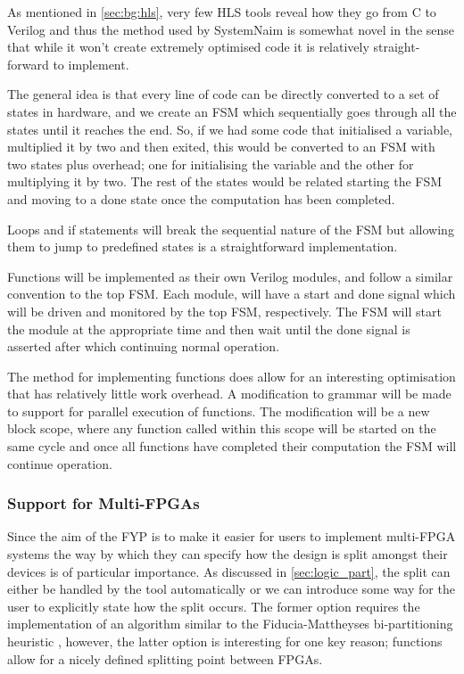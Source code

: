 As mentioned in \autoref{sec:bg:hls}, very few HLS tools reveal how they go from C to Verilog and thus the method used by SystemNaim is somewhat novel in the sense that while it won't create extremely optimised code it is relatively straight-forward to implement. 

The general idea is that every line of code can be directly converted to a set of states in hardware, and we create an FSM which sequentially goes through all the states until it reaches the end. So, if we had some code that initialised a variable, multiplied it by two and then exited, this would be converted to an FSM with two states plus overhead; one for initialising the variable and the other for multiplying it by two. The rest of the states would be related starting the FSM and moving to a done state once the computation has been completed.

Loops and if statements will break the sequential nature of the FSM but allowing them to jump to predefined states is a straightforward implementation.

Functions will be implemented as their own Verilog modules, and follow a similar convention to the top FSM. Each module, will have a start and done signal which will be driven and monitored by the top FSM, respectively. The FSM will start the module at the appropriate time and then wait until the done signal is asserted after which continuing normal operation.

The method for implementing functions does allow for an interesting optimisation that has relatively little work overhead. A modification to grammar will be made to support for parallel execution of functions. The modification will be a new block scope, where any function called within this scope will be started on the same cycle and once all functions have completed their computation the FSM will continue operation.

\subsubsection{Support for Multi-FPGAs}

Since the aim of the FYP is to make it easier for users to implement multi-FPGA systems the way by which they can specify how the design is split amongst their devices is of particular importance. As discussed in \autoref{sec:logic_part}, the split can either be handled by the tool automatically or we can introduce some way for the user to explicitly state how the split occurs. The former option requires the implementation of an algorithm similar to the Fiducia-Mattheyses bi-partitioning heuristic \cite{1585498}, however, the latter option is interesting for one key reason; functions allow for a nicely defined splitting point between FPGAs. 

